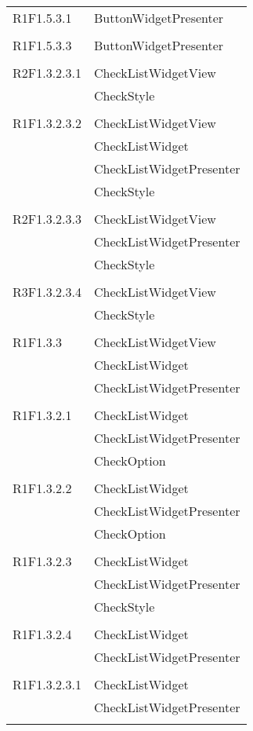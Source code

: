 \begin{center}
\begin{longtable}{|p{7cm}|p{5cm}|}
		R1F1.5.3.1 & ButtonWidgetPresenter \\ & \\ \hline
		R1F1.5.3.3 & ButtonWidgetPresenter \\ & \\ \hline
		R2F1.3.2.3.1 & CheckListWidgetView \\ & CheckStyle \\ & \\ \hline
		R1F1.3.2.3.2 & CheckListWidgetView \\ & CheckListWidget \\ & CheckListWidgetPresenter \\ & CheckStyle \\ & \\ \hline
		R2F1.3.2.3.3 & CheckListWidgetView \\ & CheckListWidgetPresenter \\ & CheckStyle \\ & \\ \hline
		R3F1.3.2.3.4 & CheckListWidgetView \\ & CheckStyle \\ & \\ \hline
		R1F1.3.3 & CheckListWidgetView \\ & CheckListWidget \\ & CheckListWidgetPresenter \\ & \\ \hline
		R1F1.3.2.1 & CheckListWidget \\ & CheckListWidgetPresenter \\ & CheckOption \\ & \\ \hline
		R1F1.3.2.2 & CheckListWidget \\ & CheckListWidgetPresenter \\ & CheckOption \\ & \\ \hline
		R1F1.3.2.3 & CheckListWidget \\ & CheckListWidgetPresenter \\ & CheckStyle \\ & \\ \hline
		R1F1.3.2.4 & CheckListWidget \\ & CheckListWidgetPresenter \\ & \\ \hline
		R1F1.3.2.3.1 & CheckListWidget \\ & CheckListWidgetPresenter \\ & \\ \hline

\end{longtable}
\end{center}
